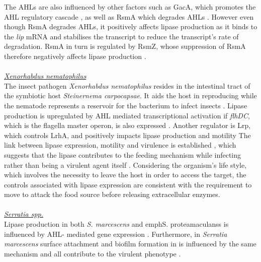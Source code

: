 \documentclass[twoside]{article}
\begin{document}
The AHLs are also influenced by other factors such as GacA, which promotes the AHL regulatory cascade \cite{reimmann1997}, as well as RsmA which degrades AHLs \cite{pessi2001}. However even though RsmA degrades AHLs, it positively affects lipase production as it binds to the \textit{lip} mRNA and stabilises the transcript to reduce the transcript's rate of degradation. RsmA in turn is regulated by RsmZ, whose suppression of RsmA therefore negatively affects lipase production \cite{heurlier2004}. 
\\
\\ \emph{\underline{Xenorhabdus nematophilus}} 
\\The insect pathogen \emph{Xenorhabdus nematophilus} resides in the intestinal tract of the symbiotic host \emph{Steinernema carpocapsae}. It aids the host in reproducing while the nematode represents a reservoir for the bacterium to infect insects \cite{herbert2007}. Lipase production is upregulated by  AHL mediated transcriptional activation \cite{dunphy_97} if \emph{flhDC}, which is the flagella master operon, is also expressed \cite{rosenau2000}. Another regulator is Lrp, which controls LrhA, and positively impacts lipase production and motility \cite{richards2008} 
The link between lipase expression, motility and virulence is established \cite{givaudan_00}, which suggests that the lipase contributes to the feeding mechanism while infecting rather than being a virulent agent itself \cite{richards2010}. Considering the organism's life style, which involves the necessity to leave the host in order to access the target, the controls associated with lipase expression are consistent with the requirement to move to attack the food source before releasing extracellular enzymes.
\\
\\ \emph{\underline{Serratia spp.}} 
\\Lipase production in both \emph{S. marcescens} and emph{S. proteamaculanss} is influenced by AHL- mediated gene expression \cite{horng2002,shibatani2000,christensen_03}. Furthermore, in \emph{Serratia marcescens} surface attachment and biofilm formation in is influenced by the same mechanism \cite{labbate2007} and all contribute to the virulent phenotype \cite{hejazi_97}.

\newpage
{}
\end{document}
